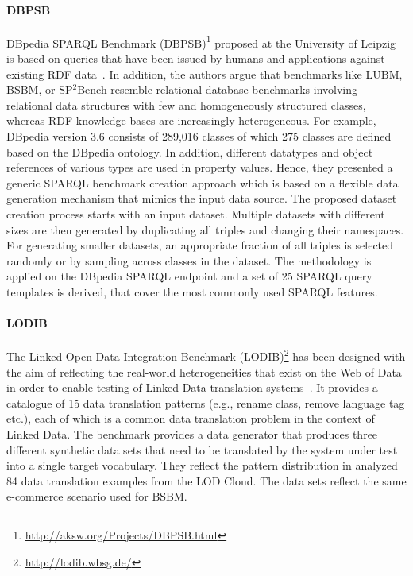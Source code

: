 \paragraph{DBPSB} DBpedia SPARQL Benchmark (DBPSB)\footnote{\url{http://aksw.org/Projects/DBPSB.html}} proposed at the University of Leipzig is based on queries that have been issued by humans and applications
against existing RDF data~\cite{Morsey2011,Morsey:2012:UBR:2900929.2901031}. In addition, the authors argue that benchmarks like LUBM, BSBM, or SP$^2$Bench resemble relational database benchmarks involving relational data structures with few and homogeneously structured classes, whereas RDF knowledge bases are increasingly heterogeneous. For example, DBpedia version 3.6 consists of 289,016 classes of which 275 classes are defined based on the DBpedia ontology. In addition, different datatypes and object references of various types are
used in property values. Hence, they presented a generic SPARQL benchmark creation approach which is based on a flexible data generation mechanism that mimics the input data source. The proposed dataset creation process starts with an input dataset. Multiple datasets with different sizes  are then generated by duplicating all triples and changing their namespaces.  For generating smaller datasets, an appropriate fraction of all triples is selected randomly or by sampling across classes in the dataset. \iffalse The goal of the query analysis and clustering is to detect prototypical queries on the basis of their frequent usage and similarity.\fi The methodology is applied on the DBpedia SPARQL endpoint and a set of 25 SPARQL query templates is derived, that cover the most commonly used SPARQL features.

\paragraph{LODIB} The Linked Open Data Integration Benchmark (LODIB)\footnote{\url{http://lodib.wbsg.de/}} has been designed with the aim of reflecting the real-world heterogeneities that exist on the Web of Data in order to enable testing of Linked Data translation systems~\cite{DBLP:conf/www/RiveroSBR12}. It provides a catalogue of 15 data translation patterns (e.g., rename class, remove language tag etc.), each of which is a common data translation problem in the context of Linked Data. The benchmark provides a data generator that produces three different synthetic data sets that need to be translated
by the system under test into a single target vocabulary. They  reflect the pattern distribution in analyzed 84 data translation examples from the LOD Cloud. The data sets reflect the same e-commerce scenario used for BSBM.


